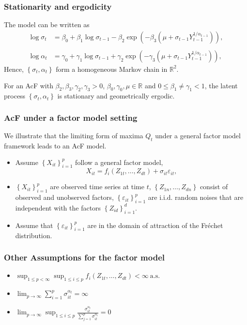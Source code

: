 \documentclass{beamer}
\newcommand{\set}[1]{\left\{#1\right\}}
\begin{document}
\begin{frame}
    \frametitle{Stationarity and ergodicity}
The model can be written as 
$$
\begin{aligned}
 \log \sigma_t & = \beta_0 +\beta_1 \log \sigma_{t-1}-\beta_2\exp(-\beta_3 (\mu+\sigma_{t-1}Y_{t-1}^{1/\alpha_{t-1}})), \\
 & \\
    \log \alpha_t &=\gamma_0+\gamma_1 \log \sigma_{t-1}+\gamma_2\exp(-\gamma_3  (\mu+\sigma_{t-1}Y_{t-1}^{1/\alpha_{t-1}})) ,
\end{aligned}
    $$
    Hence, $\set{\sigma_t,\alpha_t}$ form a homogeneous Markov chain in $\mathbb{R}^2$.
    
\begin{theorem}[1]
    For an AcF with $\beta_2,\beta_3,\gamma_2,\gamma_3>0$, $\beta_0,\gamma_0,\mu\in \mathbb{R}$ and $0\le \beta_1\ne \gamma_1<1$, the latent process $\set{\sigma_t,\alpha_t}$ is stationary and geometrically ergodic.
\end{theorem}
\end{frame}



\begin{frame}
    \frametitle{AcF under a factor model setting}
    We illustrate that the limiting form of maxima $Q_t$ under a general factor model framework leads to an AcF model.
\begin{itemize}
    \item Assume $\set{X_{it}}_{i=1}^p$ follow a general factor model,
    $$
    X_{it} = f_i(Z_{1t},\dots,Z_{dt})+\sigma_{it}\varepsilon_{it},
    $$ 
    
    \item  $\set{X_{it}}_{i=1}^p$ are observed time series at time $t$, $\set{Z_{1n},\dots,Z_{dn}}$ consist of observed and unobserved factors, $\set{\varepsilon_{it}}_{i=1}^p$ are i.i.d. random noises that are independent with the factors $\set{Z_{id}}_{i=1}^d$.
    \item Assume that $\set{\varepsilon_{it}}_{i=1}^p$ are in the domain of attraction of the Fr\'echet distribution. 
\end{itemize}
    

\end{frame}

\begin{frame}
    \frametitle{Other Assumptions for the factor model}
\begin{itemize}
    \item $\sup_{1\le p<\infty}\sup_{1\le i\le p}f_i(Z_{1t},\dots,Z_{dt})<\infty \ \text{a.s.}$
    \bigskip
    \item $\lim_{p\to \infty} \sum_{i=1}^p \sigma_{it}^{\alpha_t}=\infty$
    \bigskip
    \item $\lim_{p\to \infty} \sup_{1\le i\le p}\frac{\sigma_{it}^{\alpha_t}}{\sum_{j=1}^p\sigma_{it}^{\alpha_t}}=0$
\end{itemize}
\end{frame}
\end{document}
